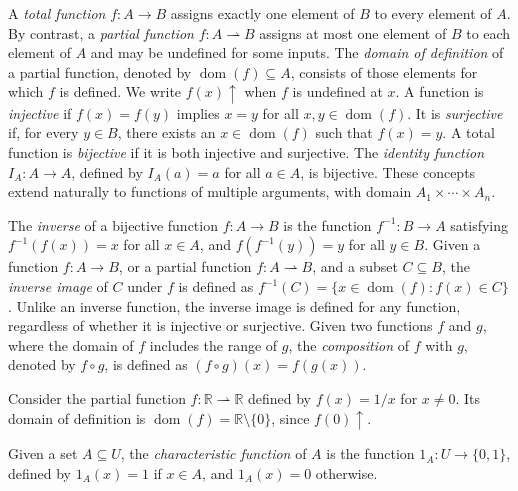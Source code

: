 A \emph{total function} $f: A \rightarrow B$ assigns exactly one element of $B$ to every element of $A$. By contrast, a \emph{partial function} $f: A \rightharpoonup B$ assigns at most one element of $B$ to each element of $A$ and may be undefined for some inputs. The \emph{domain of definition} of a partial function, denoted by $\operatorname{dom}(f) \subseteq A$, consists of those elements for which $f$ is defined. We write $f(x) \uparrow$ when $f$ is undefined at $x$. A function is \emph{injective} if $f(x) = f(y)$ implies $x = y$ for all $x,y \in \operatorname{dom}(f)$. It is \emph{surjective} if, for every $y \in B$, there exists an $x \in \operatorname{dom}(f)$ such that $f(x) = y$. A total function is \emph{bijective} if it is both injective and surjective. The \emph{identity function} $I_A: A \rightarrow A$, defined by $I_A(a) = a$ for all $a \in A$, is bijective. These concepts extend naturally to functions of multiple arguments, with domain $A_1 \times \cdots \times A_n$.

The \emph{inverse} of a bijective function $f: A \rightarrow B$ is the function $f^{-1}: B \rightarrow A$ satisfying $f^{-1}(f(x)) = x$ for all $x \in A$, and $f(f^{-1}(y)) = y$ for all $y \in B$. Given a function $f: A \rightarrow B$, or a partial function $f: A \rightharpoonup B$, and a subset $C \subseteq B$, the \emph{inverse image}  of $C$ under $f$ is defined as $f^{-1}(C) = \{x \in \operatorname{dom}(f) : f(x) \in C\}$. Unlike an inverse function, the inverse image is defined for any function, regardless of whether it is injective or surjective. Given two functions $f$ and $g$, where the domain of $f$ includes the range of $g$, the \emph{composition} of $f$ with $g$, denoted by $f \circ g$, is defined as $(f \circ g)(x) = f(g(x))$.

\begin{example}
Consider the partial function $f: \mathbb{R} \rightharpoonup \mathbb{R}$ defined by $f(x) = 1/x$ for $x \neq 0$. Its domain of definition is $\operatorname{dom}(f) = \mathbb{R} \setminus \{0\}$, since $f(0) \uparrow$.
\end{example}

Given a set $A \subseteq U$, the \emph{characteristic function} of $A$ is the function $1_A : U \rightarrow \{0, 1\}$, defined by $1_A(x) = 1$ if $x \in A$, and $1_A(x) = 0$ otherwise.

